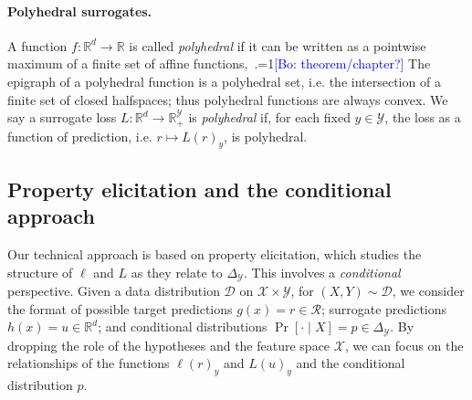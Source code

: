 \documentclass{article}
\newtheorem{theorem}{Theorem}
\theoremstyle{definition}\newtheorem{definition}{Definition}
\theoremstyle{definition}\newtheorem{assumption}{Assumption}
\newcommand{\Comments}{1}
\newcommand{\mynote}[2]{\ifnum\Comments=1\textcolor{#1}{#2}\fi}
\newcommand{\raf}[1]{\mynote{green}{[RF: #1]}}
\newcommand{\bo}[1]{\mynote{blue}{[Bo: #1]}}
\newcommand{\reals}{\mathbb{R}}
\newcommand{\simplex}{\Delta_\Y}
\newcommand{\D}{\mathcal{D}}
\newcommand{\R}{\mathcal{R}}
\newcommand{\X}{\mathcal{X}}
\newcommand{\Y}{\mathcal{Y}}
\begin{document}
%
%
%


\paragraph{Polyhedral surrogates.}
A function $f: \reals^d \to \reals$ is called \emph{polyhedral} if it can be written as a pointwise maximum of a finite set of affine functions,~\cite{rockafellar1997convex}.\bo{theorem/chapter?}
The epigraph of a polyhedral function is a polyhedral set, i.e. the intersection of a finite set of closed halfspaces; thus polyhedral functions are always convex.
We say a surrogate loss $L: \reals^d \to \reals_+^{\Y}$ is \emph{polyhedral} if, for each fixed $y \in \Y$, the loss as a function of prediction, i.e. $r \mapsto L(r)_y$, is polyhedral.

\subsection{Property elicitation and the conditional approach} \label{subsec:elic}
Our technical approach is based on property elicitation, which studies the structure of $\ell$ and $L$ as they relate to $\simplex$.
This involves a \emph{conditional} perspective.
Given a data distribution $\D$ on $\X \times \Y$, for $(X,Y) \sim \D$, we consider the format of possible target predictions $g(x) = r \in \R$; surrogate predictions $h(x) = u \in \reals^d$; and conditional distributions $\Pr[ \cdot \mid X] = p \in \simplex$.
By dropping the role of the hypotheses and the feature space $\X$, we can focus on the relationships of the functions $\ell(r)_y$ and $L(u)_y$ and the conditional distribution $p$.
\end{document}
